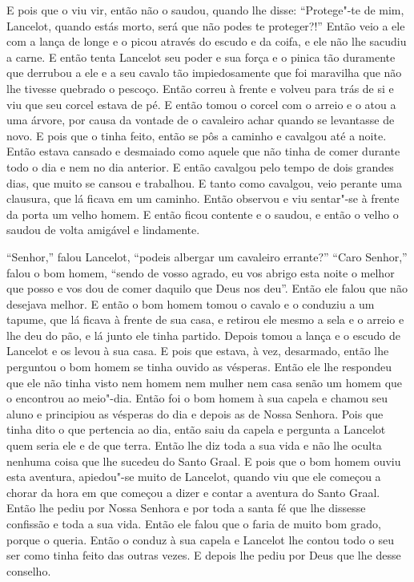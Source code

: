 E pois que o viu vir, então não o saudou, quando lhe disse: “Protege"-te de
mim, Lancelot, quando estás morto, será que não podes te proteger?!” Então
veio a ele com a lança de longe e o picou através do escudo e da coifa, e ele
não lhe sacudiu a carne. E então tenta Lancelot seu poder e sua força e o
pinica tão duramente que derrubou a ele e a seu cavalo tão impiedosamente que
foi maravilha que não lhe tivesse quebrado o pescoço. Então correu à frente e
volveu para trás de si e viu que seu corcel estava de pé. E então tomou o
corcel com o arreio e o atou a uma árvore, por causa da vontade de o cavaleiro
achar quando se levantasse de novo. E pois que o tinha feito, então se pôs a
caminho e cavalgou até a noite. Então estava cansado e desmaiado como aquele
que não tinha de comer durante todo o dia e nem no dia anterior. E então
cavalgou pelo tempo de dois grandes dias, que muito se cansou e trabalhou. E
tanto como cavalgou, veio perante uma clausura, que lá ficava em um caminho.
Então observou e viu sentar"-se à frente da porta um velho homem. E então ficou
contente e o saudou, e então o velho o saudou de volta amigável e lindamente. 

“Senhor,” falou Lancelot, “podeis albergar um cavaleiro errante?” “Caro
Senhor,” falou o bom homem, “sendo de vosso agrado, eu vos abrigo esta noite o
melhor que posso e vos dou de comer daquilo que Deus nos deu”. Então ele falou
que não desejava melhor. E então o bom homem tomou o cavalo e o conduziu a um
tapume, que lá ficava à frente de sua casa, e retirou ele mesmo a sela e o
arreio e lhe deu do pão, e lá junto ele tinha partido. Depois tomou a lança e o
escudo de Lancelot e os levou à sua casa. E pois que estava, à vez, desarmado,
então lhe perguntou o bom homem se tinha ouvido as vésperas. Então ele lhe
respondeu que ele não tinha visto nem homem nem mulher nem casa senão um homem
que o encontrou ao meio"-dia. Então foi o bom homem à sua capela e chamou seu
aluno e principiou as vésperas do dia e depois as de Nossa Senhora. Pois que
tinha dito o que pertencia ao dia, então saiu da capela e pergunta a Lancelot
quem seria ele e de que terra. Então lhe diz toda a sua vida e não lhe oculta
nenhuma coisa que lhe sucedeu do Santo Graal. E pois que o bom homem ouviu esta
aventura, apiedou"-se muito de Lancelot, quando viu que ele começou a chorar da
hora em que começou a dizer e contar a aventura do Santo Graal. Então lhe pediu
por Nossa Senhora e por toda a santa fé que lhe dissesse confissão e toda a sua
vida. Então ele falou que o faria de muito bom grado, porque o queria. Então o
conduz à sua capela e Lancelot lhe contou todo o seu ser como tinha feito das
outras vezes. E depois lhe pediu por Deus que lhe desse conselho.

